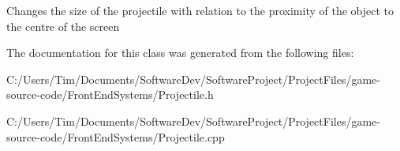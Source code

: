 Changes the size of the projectile with relation to the proximity of the object to the centre of the screen 

The documentation for this class was generated from the following files\+:\begin{DoxyCompactItemize}
\item 
C\+:/\+Users/\+Tim/\+Documents/\+Software\+Dev/\+Software\+Project/\+Project\+Files/game-\/source-\/code/\+Front\+End\+Systems/Projectile.\+h\item 
C\+:/\+Users/\+Tim/\+Documents/\+Software\+Dev/\+Software\+Project/\+Project\+Files/game-\/source-\/code/\+Front\+End\+Systems/Projectile.\+cpp\end{DoxyCompactItemize}
